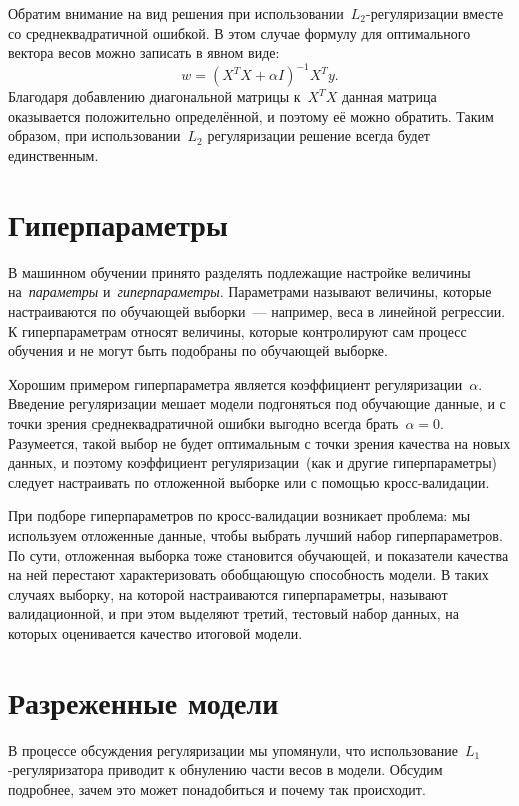 \documentclass[12pt,fleqn]{article}
\begin{document}
Обратим внимание на вид решения при использовании~$L_2$-регуляризации вместе со среднеквадратичной ошибкой.
В этом случае формулу для оптимального вектора весов можно записать в явном виде:
\[
    w
    =
    (X^T X + \alpha I)^{-1} X^T y.
\]
Благодаря добавлению диагональной матрицы к~$X^T X$ данная матрица
оказывается положительно определённой, и поэтому её можно обратить.
Таким образом, при использовании~$L_2$ регуляризации решение всегда будет единственным.

\section{Гиперпараметры}

В машинном обучении принято разделять подлежащие настройке величины
на~\emph{параметры} и~\emph{гиперпараметры}.
Параметрами называют величины, которые настраиваются по обучающей выборки~--- например,
веса в линейной регрессии.
К гиперпараметрам относят величины, которые контролируют сам процесс обучения и
не могут быть подобраны по обучающей выборке.

Хорошим примером гиперпараметра является коэффициент регуляризации~$\alpha$.
Введение регуляризации мешает модели подгоняться под обучающие данные,
и с точки зрения среднеквадратичной ошибки выгодно всегда брать~$\alpha = 0$.
Разумеется, такой выбор не будет оптимальным с точки зрения качества на новых данных,
и поэтому коэффициент регуляризации~(как и другие гиперпараметры) следует
настраивать по отложенной выборке или с помощью кросс-валидации.

При подборе гиперпараметров по кросс-валидации возникает проблема:
мы используем отложенные данные, чтобы выбрать лучший набор гиперпараметров.
По сути, отложенная выборка тоже становится обучающей, и показатели качества на ней
перестают характеризовать обобщающую способность модели.
В таких случаях выборку, на которой настраиваются гиперпараметры,
называют валидационной, и при этом выделяют третий, тестовый набор данных,
на которых оценивается качество итоговой модели.

\section{Разреженные модели}

В процессе обсуждения регуляризации мы упомянули, что использование~$L_1$-регуляризатора
приводит к обнулению части весов в модели.
Обсудим подробнее, зачем это может понадобиться и почему так происходит.
\end{document}
